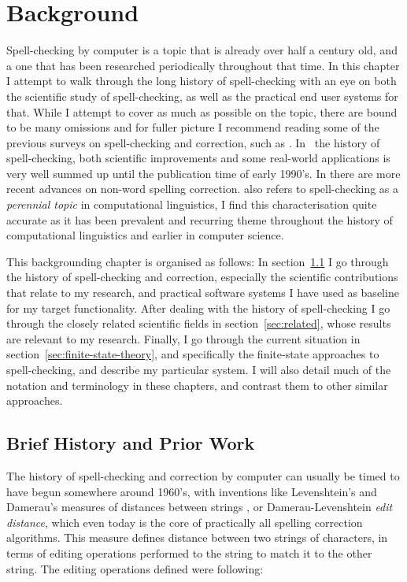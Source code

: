 \documentclass[officiallayout,draft]{unihelcompling}
\begin{document}
\chapter{Background}
\label{chap:background}

Spell-checking by computer is a topic that is already over half a century old,
and a one that has been researched periodically throughout that time.  In this
chapter I attempt to walk through the long history of spell-checking with an
eye on both the scientific study of spell-checking, as well as the practical
end user systems for that. While I attempt to cover as much as possible on the
topic, there are bound to be many omissions and for fuller picture I recommend
reading some of the previous surveys on spell-checking and correction, such as
\citet{kukich1992spelling,mitton2009ordering}.  In~\citet{kukich1992spelling}
the history of spell-checking, both scientific improvements and some real-world
applications is very well summed up until the publication time of early 1990's.
In \citet{mitton2009ordering} there are more recent advances on non-word
spelling correction.  \citet{kukich1992spelling} also refers to spell-checking
as a \emph{perennial topic} in computational linguistics, I find this
characterisation quite accurate as it has been prevalent and recurring theme
throughout the history of computational linguistics and earlier in
computer science.

This backgrounding chapter is organised as follows: In
section~\ref{sec:history} I go through the history of spell-checking and
correction, especially the scientific contributions that relate to my research,
and practical software systems I have used as baseline for my target
functionality.  After dealing with the history of spell-checking I go through
the closely related scientific fields in section~\ref{sec:related}, whose
results are relevant to my research. Finally, I go through the current
situation in section~\ref{sec:finite-state-theory}, and specifically the
finite-state approaches to spell-checking, and describe my particular system. I
will also detail much of the notation and terminology in these chapters, and
contrast them to other similar approaches.

\section{Brief History and Prior Work}
\label{sec:history}

The history of spell-checking and correction by computer can usually be timed
to have begun somewhere around 1960's, with inventions like Levenshtein's and
Damerau's measures of distances between strings
\citep{levenshtein1966binary,damerau1964technique}, or Damerau-Levenshtein
\emph{edit distance}, which even today is the core of practically all spelling
correction algorithms. This measure defines distance between two strings of
characters, in terms of editing operations performed to the string to match it
to the other string. The editing operations defined were following:
\end{document}
